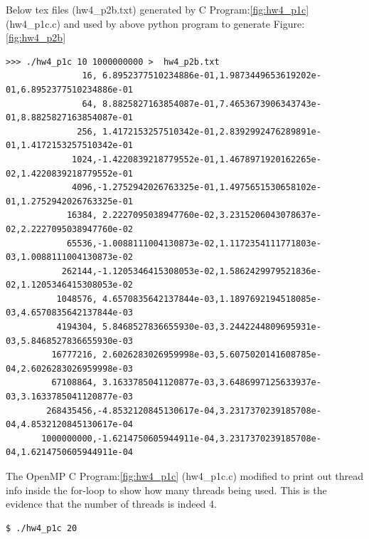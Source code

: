 \documentclass{article}
\begin{document}
Below tex files (hw4\_p2b.txt)  generated by C Program:\ref{fig:hw4_p1c} (hw4\_p1c.c) and used by above python program to generate Figure:\ref{fig:hw4_p2b} 
\begin{lstlisting}
>>> ./hw4_p1c 10 1000000000 >  hw4_p2b.txt
               16, 6.8952377510234886e-01,1.9873449653619202e-01,6.8952377510234886e-01 
               64, 8.8825827163854087e-01,7.4653673906343743e-01,8.8825827163854087e-01 
              256, 1.4172153257510342e-01,2.8392992476289891e-01,1.4172153257510342e-01 
             1024,-1.4220839218779552e-01,1.4678971920162265e-02,1.4220839218779552e-01 
             4096,-1.2752942026763325e-01,1.4975651530658102e-01,1.2752942026763325e-01 
            16384, 2.2227095038947760e-02,3.2315206043078637e-02,2.2227095038947760e-02 
            65536,-1.0088111004130873e-02,1.1172354111771803e-03,1.0088111004130873e-02 
           262144,-1.1205346415308053e-02,1.5862429979521836e-02,1.1205346415308053e-02 
          1048576, 4.6570835642137844e-03,1.1897692194518085e-03,4.6570835642137844e-03 
          4194304, 5.8468527836655930e-03,3.2442244809695931e-03,5.8468527836655930e-03 
         16777216, 2.6026283026959998e-03,5.6075020141608785e-04,2.6026283026959998e-03 
         67108864, 3.1633785041120877e-03,3.6486997125633937e-03,3.1633785041120877e-03 
        268435456,-4.8532120845130617e-04,3.2317370239185708e-04,4.8532120845130617e-04 
       1000000000,-1.6214750605944911e-04,3.2317370239185708e-04,1.6214750605944911e-04  

\end{lstlisting}




The OpenMP C Program:\ref{fig:hw4_p1c} (hw4\_p1c.c)  modified to print out thread info inside the for-loop to show how many threads being used. This is the evidence that the number of threads is indeed 4.
\begin{verbatim}
$ ./hw4_p1c 20 
\end{verbatim}
\end{document}
